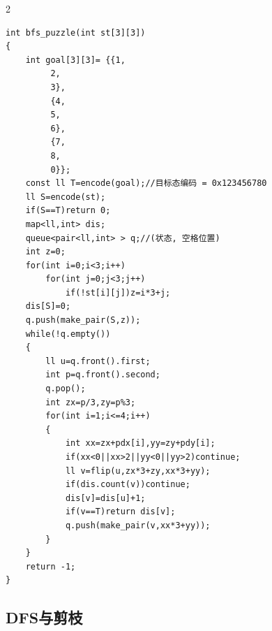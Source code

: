\documentclass[UTF8,fontset=fandol,a4paper,twoside]{ctexart}
\begin{document}
\begin{multicols}{2}
\begin{lstlisting}
int bfs_puzzle(int st[3][3])
{
    int goal[3][3]= {{1,
         2,
         3},
         {4,
         5,
         6},
         {7,
         8,
         0}};
    const ll T=encode(goal);//目标态编码 = 0x123456780
    ll S=encode(st);
    if(S==T)return 0;
    map<ll,int> dis;
    queue<pair<ll,int> > q;//(状态, 空格位置)
    int z=0;
    for(int i=0;i<3;i++)
        for(int j=0;j<3;j++)
            if(!st[i][j])z=i*3+j;
    dis[S]=0;
    q.push(make_pair(S,z));
    while(!q.empty())
    {
        ll u=q.front().first;
        int p=q.front().second;
        q.pop();
        int zx=p/3,zy=p%3;
        for(int i=1;i<=4;i++)
        {
            int xx=zx+pdx[i],yy=zy+pdy[i];
            if(xx<0||xx>2||yy<0||yy>2)continue;
            ll v=flip(u,zx*3+zy,xx*3+yy);
            if(dis.count(v))continue;
            dis[v]=dis[u]+1;
            if(v==T)return dis[v];
            q.push(make_pair(v,xx*3+yy));
        }
    }
    return -1;
}
\end{lstlisting}
\subsection{DFS与剪枝}


\end{multicols}
\end{document}
